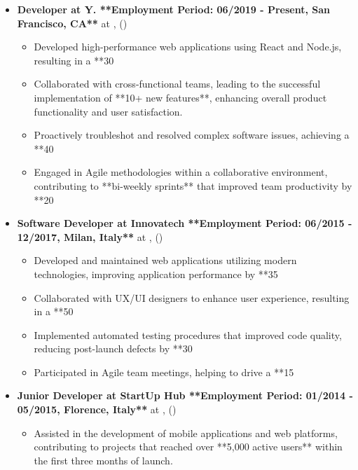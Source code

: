 \documentclass[a4paper,10pt]{article}
\begin{document}
\begin{itemize}[leftmargin=*]
\item \textbf{Developer at Y.
**Employment Period: 06/2019 - Present, San Francisco, CA**
} at \textit{},  ()
\begin{itemize}[noitemsep]
\item Developed high-performance web applications using React and Node.js, resulting in a **30%
\item Collaborated with cross-functional teams, leading to the successful implementation of **10+ new features**, enhancing overall product functionality and user satisfaction.
\item Proactively troubleshot and resolved complex software issues, achieving a **40%
\item Engaged in Agile methodologies within a collaborative environment, contributing to **bi-weekly sprints** that improved team productivity by **20%
\end{itemize}
\item \textbf{Software Developer at Innovatech
**Employment Period: 06/2015 - 12/2017, Milan, Italy**
} at \textit{},  ()
\begin{itemize}[noitemsep]
\item Developed and maintained web applications utilizing modern technologies, improving application performance by **35%
\item Collaborated with UX/UI designers to enhance user experience, resulting in a **50%
\item Implemented automated testing procedures that improved code quality, reducing post-launch defects by **30%
\item Participated in Agile team meetings, helping to drive a **15%
\end{itemize}
\item \textbf{Junior Developer at StartUp Hub
**Employment Period: 01/2014 - 05/2015, Florence, Italy**
} at \textit{},  ()
\begin{itemize}[noitemsep]
\item Assisted in the development of mobile applications and web platforms, contributing to projects that reached over **5,000 active users** within the first three months of launch.

\end{itemize}
\end{itemize}
\end{document}

